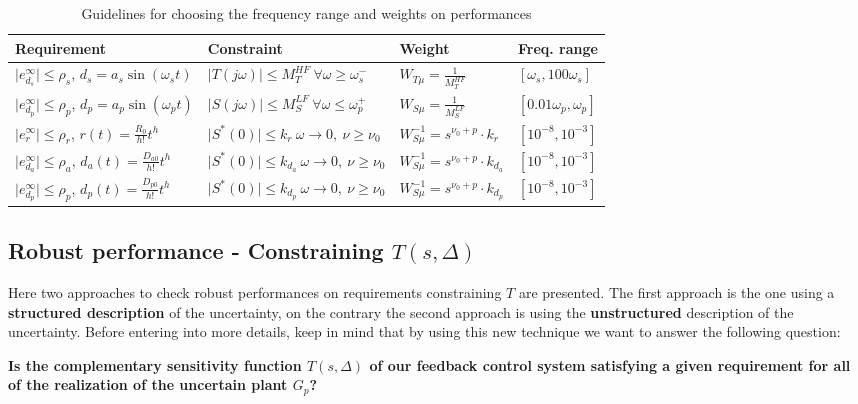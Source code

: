 \documentclass[a4paper, 12pt]{article}
\begin{document}
\begin{table}[h]
    \centering
    \begin{tabular}{p{5cm} p{5cm} p{3cm} p{3cm}}
        \midrule[1.5pt]
        \textbf{Requirement}&\textbf{Constraint}&\textbf{Weight}&\textbf{Freq. range}\\
        \midrule
        $\vert e_{d_s}^\infty \vert \le \rho_s$, $d_s=a_s\sin(\omega_s{t})$&$\vert T(j\omega) \vert \le M_T^{HF} \ \forall \omega \ge \omega_s^{-}$&$W_{T\mu}=\frac{1}{M_T^{HF}}$&$[\omega_s,100\omega_s]$\\
        \midrule
        $\vert e_{d_p}^\infty \vert \le \rho_p$, $d_p=a_p\sin(\omega_p{t})$&$\vert S(j\omega) \vert \le M_S^{LF} \ \forall \omega \le \omega_p^{+}$&$W_{S\mu}=\frac{1}{M_S^{LF}}$&$[0.01\omega_p,\omega_p]$\\
        \midrule
        $\vert e_r^\infty \vert \le \rho_r$, $r(t)=\frac{R_0}{h!}{t^h}$& $\vert S^{*}(0) \vert \le k_{r} \ \omega \to 0, \ \nu\ge\nu_0$&$W_{S\mu}^{-1}=s^{\nu_0+p} \cdot k_{r}$&$[10^{-8},10^{-3}]$\\
        \midrule
        $\vert e_{d_a}^\infty \vert \le \rho_a$, $d_a(t)=\frac{D_{a0}}{h!}{t^h}$& $\vert S^{*}(0) \vert \le k_{d_a} \ \omega \to 0, \ \nu\ge\nu_0$&$W_{S\mu}^{-1}=s^{\nu_0+p} \cdot k_{d_a}$&$[10^{-8},10^{-3}]$\\
        \midrule
        $\vert e_{d_p}^\infty \vert \le \rho_p$, $d_p(t)=\frac{D_{p0}}{h!}{t^h}$& $\vert S^{*}(0) \vert \le k_{d_p} \ \omega \to 0, \ \nu\ge\nu_0$&$W_{S\mu}^{-1}=s^{\nu_0+p} \cdot k_{d_p}$&$[10^{-8},10^{-3}]$
    \end{tabular}
    \caption{Guidelines for choosing the frequency range and weights on performances}
    \label{tab:guideline}
\end{table}

\newpage
\subsection{Robust performance - Constraining $T(s,\Delta)$}
Here two approaches to check robust performances on requirements constraining $T$ are presented. The first approach is the one using a \textbf{structured description} of the uncertainty, on the contrary the second approach is using the \textbf{unstructured} description of the uncertainty. Before entering into more details, keep in mind that by using this new technique we want to answer the following question:
\begin{center}
    \textbf{Is the complementary sensitivity function $T(s,\Delta)$ of our feedback control system satisfying a given requirement for 
    all of the realization of the uncertain plant $G_p$?}
\end{center}
\end{document}
